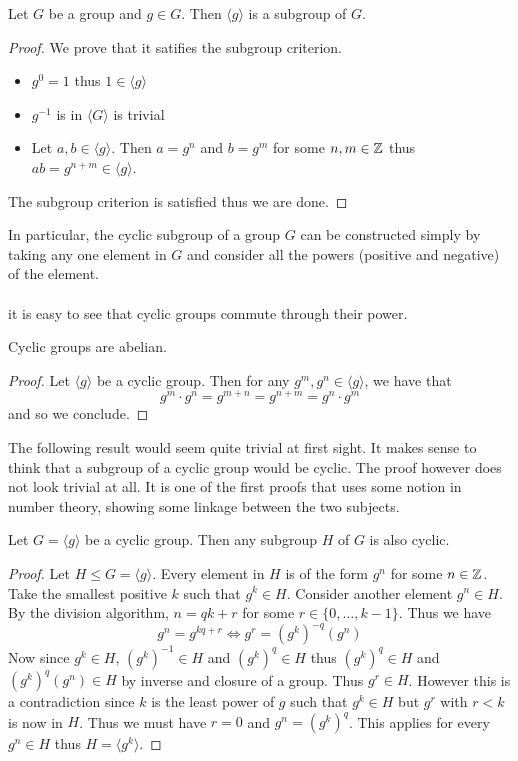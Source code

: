 \documentclass[a4paper]{article}
\begin{document}
\begin{prp}{}{} Let $G$ be a group and $g\in G$. Then $\langle g\rangle$ is a subgroup of $G$. \tcbline
\begin{proof} We prove that it satifies the subgroup criterion. 
\begin{itemize}
\item $g^0=1$ thus $1\in\langle g\rangle$ 
\item $g^{-1}$ is in $\langle G\rangle$ is trivial
\item Let $a,b\in\langle g\rangle$. Then $a=g^n$ and $b=g^m$ for some $n,m\in\mathbb{Z}$ thus $ab=g^{n+m}\in\langle g\rangle$. 
\end{itemize}
The subgroup criterion is satisfied thus we are done. 
\end{proof}
\end{prp}

In particular, the cyclic subgroup of a group $G$ can be constructed simply by taking any one element in $G$ and consider all the powers (positive and negative) of the element. \\~\\

it is easy to see that cyclic groups commute through their power. 

\begin{lmm}{}{} Cyclic groups are abelian. \tcbline
\begin{proof}
Let $\langle g\rangle$ be a cyclic group. Then for any $g^m,g^n\in\langle g\rangle$, we have that $$g^m\cdot g^n=g^{m+n}=g^{n+m}=g^n\cdot g^m$$ and so we conclude. 
\end{proof}
\end{lmm}

The following result would seem quite trivial at first sight. It makes sense to think that a subgroup of a cyclic group would be cyclic. The proof however does not look trivial at all. It is one of the first proofs that uses some notion in number theory, showing some linkage between the two subjects. 

\begin{prp}{}{} Let $G=\langle g\rangle $ be a cyclic group. Then any subgroup $H$ of $G$ is also cyclic. \tcbline
\begin{proof} Let $H\leq G=\langle g\rangle$. Every element in $H$ is of the form $g^n$ for some $n\in\mathbb{Z}$. Take the smallest positive $k$ such that $g^k\in H$. Consider another element $g^n\in H$. By the division algorithm, $n=qk+r$ for some $r\in\{0,\dots,k-1\}$. Thus we have $$g^n=g^{kq+r}\iff g^r=(g^k)^{-q}(g^n)$$ Now since $g^k\in H$, $(g^k)^{-1}\in H$ and $(g^k)^q\in H$ thus $(g^k)^q\in H$ and $(g^k)^q(g^n)\in H$ by inverse and closure of a group. Thus $g^r\in H$. However this is a contradiction since $k$ is the least power of $g$ such that $g^k\in H$ but $g^r$ with $r<k$ is now in $H$. Thus we must have $r=0$ and $g^n=(g^k)^q$. This applies for every $g^n\in H$ thus $H=\langle g^k\rangle$. 
\end{proof}
\end{prp}
\end{document}
